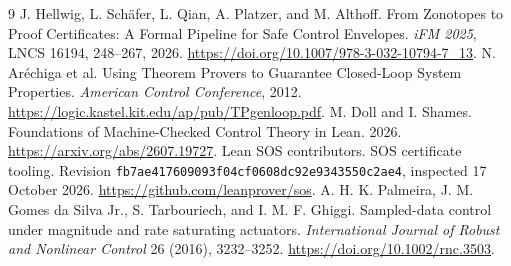 \documentclass[10pt]{article}
\newcommand{\code}[1]{\texttt{#1}}
\begin{document}
\begin{thebibliography}{9}\small
{} J. Hellwig, L. Sch\"afer, L. Qian, A. Platzer, and M. Althoff.
From Zonotopes to Proof Certificates: A Formal Pipeline for Safe Control Envelopes.
\emph{iFM 2025}, LNCS 16194, 248--267, 2026.
\url{https://doi.org/10.1007/978-3-032-10794-7_13}.
 N. Ar\'echiga et al.
Using Theorem Provers to Guarantee Closed-Loop System Properties.
\emph{American Control Conference}, 2012.
\url{https://logic.kastel.kit.edu/ap/pub/TPgenloop.pdf}.
 M. Doll and I. Shames.
Foundations of Machine-Checked Control Theory in Lean. 2026.
\url{https://arxiv.org/abs/2607.19727}.
 Lean SOS contributors. SOS certificate tooling.
Revision \code{fb7ae417609093f04cf0608dc92e9343550c2ae4}, inspected 17 October 2026.
\url{https://github.com/leanprover/sos}.
 A. H. K. Palmeira, J. M. Gomes da Silva Jr., S. Tarbouriech, and I. M. F. Ghiggi.
Sampled-data control under magnitude and rate saturating actuators.
\emph{International Journal of Robust and Nonlinear Control} 26 (2016), 3232--3252.
\url{https://doi.org/10.1002/rnc.3503}.
\end{thebibliography}
\end{document}
